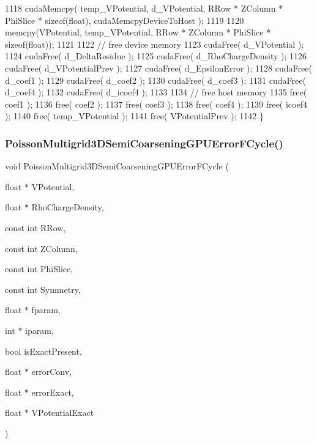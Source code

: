 \begin{DoxyCode}
1118     cudaMemcpy( temp\_VPotential, d\_VPotential, RRow * ZColumn * PhiSlice * \textcolor{keyword}{sizeof}(\textcolor{keywordtype}{float}), 
      cudaMemcpyDeviceToHost );
1119 
1120     memcpy(VPotential, temp\_VPotential, RRow * ZColumn * PhiSlice * \textcolor{keyword}{sizeof}(\textcolor{keywordtype}{float}));
1121 
1122     \textcolor{comment}{// free device memory}
1123     cudaFree( d\_VPotential );
1124     cudaFree( d\_DeltaResidue );
1125     cudaFree( d\_RhoChargeDensity );
1126     cudaFree( d\_VPotentialPrev );
1127     cudaFree( d\_EpsilonError );
1128     cudaFree( d\_coef1 );
1129     cudaFree( d\_coef2 );
1130     cudaFree( d\_coef3 );
1131     cudaFree( d\_coef4 );
1132     cudaFree( d\_icoef4 );
1133 
1134     \textcolor{comment}{// free host memory}
1135     free( coef1 );
1136     free( coef2 );
1137     free( coef3 );
1138     free( coef4 );
1139     free( icoef4 );
1140     free( temp\_VPotential );
1141     free( VPotentialPrev );
1142 \}
\end{DoxyCode}
\hypertarget{PoissonSolver3DGPU_8cu_a2a1da5844b8c399a35f446977c7ac550}{}\label{PoissonSolver3DGPU_8cu_a2a1da5844b8c399a35f446977c7ac550} 
\subsubsection{\texorpdfstring{Poisson\+Multigrid3\+D\+Semi\+Coarsening\+G\+P\+U\+Error\+F\+Cycle()}{PoissonMultigrid3DSemiCoarseningGPUErrorFCycle()}}
{\footnotesize\ttfamily void Poisson\+Multigrid3\+D\+Semi\+Coarsening\+G\+P\+U\+Error\+F\+Cycle (\begin{DoxyParamCaption}\item[{float $\ast$}]{V\+Potential,  }\item[{float $\ast$}]{Rho\+Charge\+Density,  }\item[{const int}]{R\+Row,  }\item[{const int}]{Z\+Column,  }\item[{const int}]{Phi\+Slice,  }\item[{const int}]{Symmetry,  }\item[{float $\ast$}]{fparam,  }\item[{int $\ast$}]{iparam,  }\item[{bool}]{is\+Exact\+Present,  }\item[{float $\ast$}]{error\+Conv,  }\item[{float $\ast$}]{error\+Exact,  }\item[{float $\ast$}]{V\+Potential\+Exact }\end{DoxyParamCaption})}

